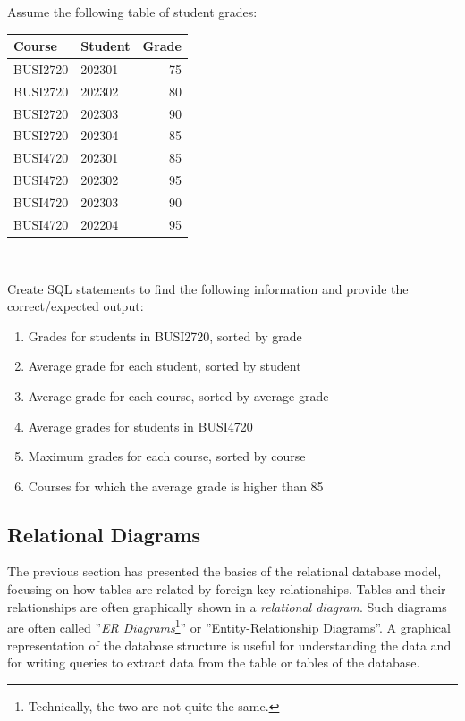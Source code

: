 \begin{exerciseboxpaper}
Assume the following table of student grades: \\

\renewcommand{\arraystretch}{1.25}
  \begin{tabular}{l|l|r} 
    {\bf Course} & {\bf Student} & {\bf Grade} \\ \hline
    BUSI2720 & 202301 & 75 \\ 
    BUSI2720 & 202302 & 80 \\
    BUSI2720 & 202303 & 90 \\ 
    BUSI2720 & 202304 & 85 \\
    BUSI4720 & 202301 & 85 \\
    BUSI4720 & 202302 & 95 \\
    BUSI4720 & 202303 & 90 \\ 
    BUSI4720 & 202204 & 95 \\ \hline
  \end{tabular} \\
\vspace{.5\baselineskip}

Create SQL statements to find the following information and provide the correct/expected output:
  \begin{enumerate}
    \item Grades for students in BUSI2720, sorted by grade
    \item Average grade for each student, sorted by student
    \item Average grade for each course, sorted by average grade
    \item Average grades for students in BUSI4720
    \item Maximum grades for each course, sorted by course
    \item Courses for which the average grade is higher than 85
  \end{enumerate}
\end{exerciseboxpaper}

\subsection*{Relational Diagrams}

The previous section has presented the basics of the relational database model, focusing on how tables are related by foreign key relationships. Tables and their relationships are often graphically shown in a \emph{relational diagram}. Such diagrams are often called ''\emph{ER Diagrams}\footnote{Technically, the two are not quite the same.}'' or ''Entity-Relationship Diagrams''. A graphical representation of the database structure is useful for understanding the data and for writing queries to extract data from the table or tables of the database. 

